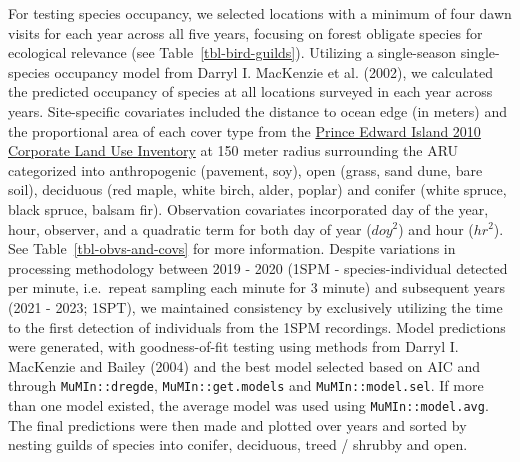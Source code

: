 \documentclass[
  letterpaper,
  DIV=11,
  numbers=noendperiod,
  oneside]{scrartcl}
\begin{document}
For testing species occupancy, we selected locations with a minimum of
four dawn visits for each year across all five years, focusing on forest
obligate species for ecological relevance (see
Table~\ref{tbl-bird-guilds}). Utilizing a single-season single-species
occupancy model from Darryl I. MacKenzie et al.
(2002),
we calculated the predicted occupancy of species at all locations
surveyed in each year across years. Site-specific covariates included
the distance to ocean edge (in meters) and the proportional area of each
cover type from the
\href{https://data.princeedwardisland.ca/Environment-and-Food/OD0144-Corporate-Landuse-Inventory-2010/tc7z-7rpy}{Prince
Edward Island 2010 Corporate Land Use Inventory} at 150 meter radius
surrounding the ARU categorized into anthropogenic (pavement, soy), open
(grass, sand dune, bare soil), deciduous (red maple, white birch, alder,
poplar) and conifer (white spruce, black spruce, balsam fir).
Observation covariates incorporated day of the year, hour, observer, and
a quadratic term for both day of year (\(doy^{2}\)) and hour
(\(hr^{2}\)). See Table~\ref{tbl-obvs-and-covs} for more information.
Despite variations in processing methodology between 2019 - 2020 (1SPM -
species-individual detected per minute, i.e.~repeat sampling each minute
for 3 minute) and subsequent years (2021 - 2023; 1SPT), we maintained
consistency by exclusively utilizing the time to the first detection of
individuals from the 1SPM recordings. Model predictions were generated,
with goodness-of-fit testing using methods from Darryl I. MacKenzie and
Bailey
(2004)
and the best model selected based on AIC and through
\texttt{MuMIn::dregde}, \texttt{MuMIn::get.models} and
\texttt{MuMIn::model.sel}. If more than one model existed, the average
model was used using \texttt{MuMIn::model.avg}. The final predictions
were then made and plotted over years and sorted by nesting guilds of
species into conifer, deciduous, treed / shrubby and open.
\end{document}
